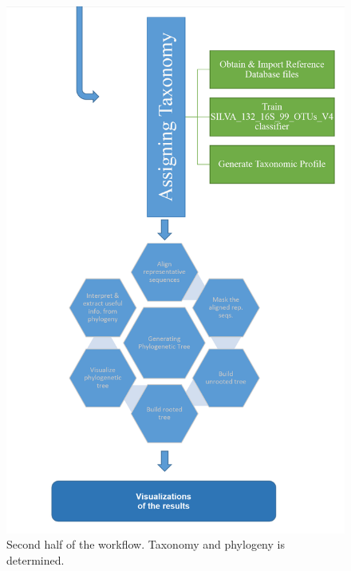 \documentclass{singlecol-new}
\theoremstyle{TH}{
\newtheorem{lemma}{Lemma}
\newtheorem{theorem}[lemma]{Theorem}
\newtheorem{corrolary}[lemma]{Corrolary}
\newtheorem{conjecture}[lemma]{Conjecture}
\newtheorem{proposition}[lemma]{Proposition}
\newtheorem{claim}[lemma]{Claim}
\newtheorem{stheorem}[lemma]{Wrong Theorem}
\newtheorem{algorithm}{Algorithm}
}
\theoremstyle{THrm}{
\newtheorem{definition}{Definition}[section]
\newtheorem{question}{Question}[section]
\newtheorem{remark}{Remark}
\newtheorem{scheme}{Scheme}
}
\theoremstyle{THhit}{
\newtheorem{case}{Case}[section]
}
\begin{document}
\begin{figure}[htbp]
\centerline{\includegraphics[scale=0.35]{figures/Workflow2.png}}
\caption{Second half of the workflow. Taxonomy and phylogeny is determined.}
\label{fig. 2}
\end{figure}
\end{document}
